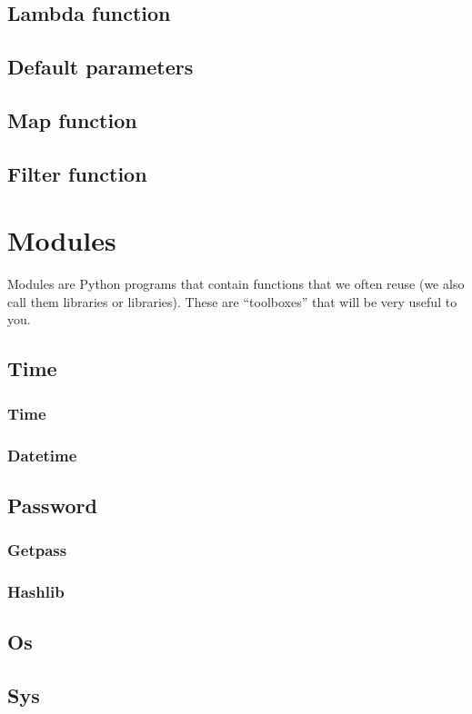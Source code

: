 \documentclass[a4paper, 12pt]{article}
\begin{document}
\subsection{Lambda function}
\label{subsec:Lambda}
\subsection{Default parameters}
\subsection{Map function}
\subsection{Filter function}

\newpage
\section{Modules}
Modules are Python programs that contain functions that we often reuse (we also call them libraries or libraries). These are “toolboxes” that will be very useful to you.\newline
\subsection{Time}
\subsubsection{Time}
\subsubsection{Datetime}
\subsection{Password}
\subsubsection{Getpass}
\subsubsection{Hashlib}
\subsection{Os}
\subsection{Sys}
\end{document}
